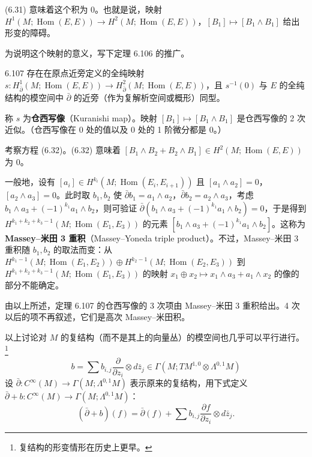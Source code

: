 (6.31) 意味着这个积为 0。也就是说，映射 $H^{1}(M;\operatorname{Hom}(E,E))\to H^{2}(M;\operatorname{Hom}(E,E))$，$[B_1]\mapsto[B_1\wedge B_1]$ 给出形变的障碍。

为说明这个映射的意义，写下定理 6.106 的推广。

\begin{theorem}{6.107}
  存在在原点近旁定义的全纯映射 $s\colon H^{1}_{\bar\partial}(M;\operatorname{Hom}(E,E))\to H^{2}_{\bar\partial}(M;\operatorname{Hom}(E,E))$，且 $s^{-1}(0)$ 与 $E$ 的全纯结构的模空间中 $\bar\partial$ 的近旁（作为复解析空间或概形）同型。
\end{theorem}

称 $s$ 为\textbf{仓西写像}（Kuranishi map）。映射 $[B_1]\mapsto[B_1\wedge B_1]$ 是仓西写像的 2 次近似。（仓西写像在 0 处的值以及 0 处的 1 阶微分都是 0。）

考察方程 (6.32)。(6.32) 意味着 $[B_1\wedge B_2+B_2\wedge B_1]\in H^{2}(M;\operatorname{Hom}(E,E))$ 为 0。

一般地，设有 $[a_i]\in H^{k_i}(M;\operatorname{Hom}(E_i,E_{i+1}))$ 且 $[a_1\wedge a_2]=0$，$[a_2\wedge a_3]=0$。此时取 $b_1,b_2$ 使 $\bar\partial b_1=a_1\wedge a_2$，$\bar\partial b_2=a_2\wedge a_3$，考虑 $b_1\wedge a_3+(-1)^{k_1}a_1\wedge b_2$，则可验证 $\bar\partial(b_1\wedge a_3+(-1)^{k_1}a_1\wedge b_2)=0$，于是得到 $H^{k_1+k_2+k_3-1}(M;\operatorname{Hom}(E_1,E_3))$ 的元素 $[b_1\wedge a_3+(-1)^{k_1}a_1\wedge b_2]$。这称为\textbf{Massey–米田 3 重积}（Massey–Yoneda triple product）。不过，Massey–米田 3 重积随 $b_1,b_2$ 的取法而变：从 $H^{k_1-1}(M;\operatorname{Hom}(E_1,E_2))\oplus H^{k_2-1}(M;\operatorname{Hom}(E_2,E_3))$ 到 $H^{k_1+k_2+k_3-1}(M;\operatorname{Hom}(E_1,E_3))$ 的映射 $x_1\oplus x_2\mapsto x_1\wedge a_3+a_1\wedge x_2$ 的像的部分不能确定。

由以上所述，定理 6.107 的仓西写像的 3 次项由 Massey–米田 3 重积给出。4 次以后的项不再叙述，它们是高次 Massey–米田积。

以上讨论对 $M$ 的复结构（而不是其上的向量丛）的模空间也几乎可以平行进行。\footnote{复结构的形变情形在历史上更早。}
\[
  b=\sum b_{i,j}\frac{\partial}{\partial z_i}\otimes d\bar z_j\in\Gamma(M;TM^{1,0}\otimes\Lambda^{0,1}M)
\]
设 $\bar\partial\colon C^\infty(M)\to\Gamma(M;\Lambda^{0,1}M)$ 表示原来的复结构，用下式定义 $\bar\partial+b\colon C^\infty(M)\to\Gamma(M;\Lambda^{0,1}M)$：
\begin{equation}
  (\bar\partial+b)(f)=\bar\partial(f)+\sum b_{i,j}\frac{\partial f}{\partial z_i}\otimes d\bar z_j. \tag{6.34}
\end{equation}

